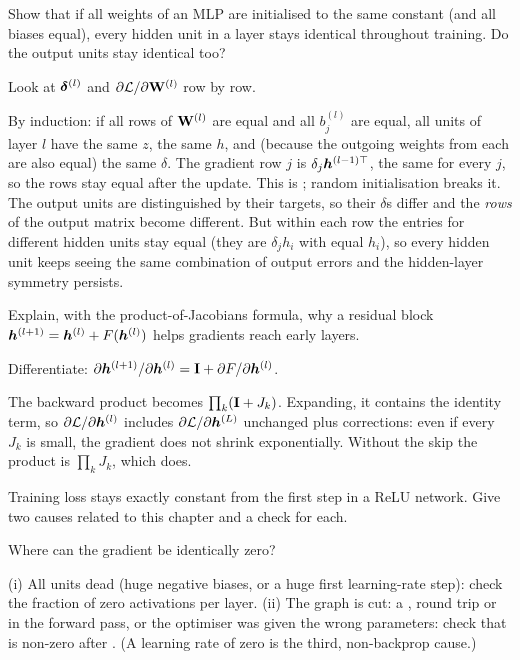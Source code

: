 \begin{problem}\twochili
	Show that if all weights of an MLP are initialised to the same constant (and all biases
	equal), every hidden unit in a layer stays identical throughout training. Do the output
	units stay identical too?
	\begin{hint}Look at $\bm{\delta}^{(l)}$ and $\partial\mathcal{L}/\partial{\mathbf{W}}^{(l)}$ row by row.\end{hint}
	\begin{sol}
		By induction: if all rows of ${\mathbf{W}}^{(l)}$ are equal and all $b^{(l)}_j$ are equal, all units of
		layer $l$ have the same $z$, the same $h$, and (because the outgoing weights from each are also
		equal) the same $\delta$. The gradient row $j$ is $\delta_j{\bm{h}}^{(l-1)\top}$, the same for every
		$j$, so the rows stay equal after the update. This is ; random
		initialisation breaks it. The output units are distinguished by their targets, so their
		$\delta$s differ and the \emph{rows} of the output matrix become different. But within each
		row the entries for different hidden units stay equal (they are $\delta_j h_i$ with equal
		$h_i$), so every hidden unit keeps seeing the same combination of output errors and the
		hidden-layer symmetry persists.
	\end{sol}
\end{problem}

\begin{problem}\twochili
	Explain, with the product-of-Jacobians formula, why a residual block
	${\bm{h}}^{(l+1)}={\bm{h}}^{(l)}+F({\bm{h}}^{(l)})$ helps gradients reach early layers.
	\begin{hint}Differentiate: $\partial{\bm{h}}^{(l+1)}/\partial{\bm{h}}^{(l)}={\mathbf{I}}+\partial F/\partial{\bm{h}}^{(l)}$.\end{hint}
	\begin{sol}
		The backward product becomes $\prod_k({\mathbf{I}}+J_k)$. Expanding, it contains the identity term, so
		$\partial\mathcal{L}/\partial{\bm{h}}^{(l)}$ includes $\partial\mathcal{L}/\partial{\bm{h}}^{(L)}$ unchanged plus
		corrections: even if every $J_k$ is small, the gradient does not shrink exponentially.
		Without the skip the product is $\prod_kJ_k$, which does.
	\end{sol}
\end{problem}

\begin{problem}\onechili
	Training loss stays exactly constant from the first step in a ReLU network. Give two
	causes related to this chapter and a check for each.
	\begin{hint}Where can the gradient be identically zero?\end{hint}
	\begin{sol}
		(i) All units dead (huge negative biases, or a huge first learning-rate step): check the
		fraction of zero activations per layer. (ii) The graph is cut: a \pt{.detach()},
		 round trip or  in the forward pass, or the optimiser
		was given the wrong parameters: check that  is non-zero after
		. (A learning rate of zero is the third, non-backprop cause.)
	\end{sol}
\end{problem}
